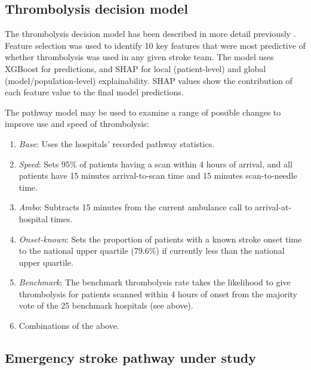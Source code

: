 \subsection{Thrombolysis decision model}

The thrombolysis decision model has been described in more detail previously \cite{pearn_what_2023}. Feature selection was used to identify 10 key features that were most predictive of whether thrombolysis was used in any given stroke team. The model uses XGBoost \cite{chen_xgboost_2016} for predictions, and SHAP \cite{lundberg_unified_2017} for local (patient-level) and global (model/population-level) explainability. SHAP values show the contribution of each feature value to the final model predictions.


The pathway model may be used to examine a range of possible changes to improve use and speed of thrombolysis:

\begin{enumerate}

    \item \textit{Base}: Uses the hospitals’ recorded pathway statistics.

    \item \textit{Speed}: Sets 95\% of patients having a scan within 4 hours of arrival, and all patients have 15 minutes arrival-to-scan time and 15 minutes scan-to-needle time.

    \item \textit{Ambo}: Subtracts 15 minutes from the current ambulance call to arrival-at-hospital times.

    \item  \textit{Onset-known}: Sets the proportion of patients with a known stroke onset time to the national upper quartile (79.6\%) if currently less than the national upper quartile.

    \item \textit{Benchmark}: The benchmark thrombolysis rate takes the likelihood to give thrombolysis for patients scanned within 4 hours of onset from the majority vote of the 25 benchmark hospitals (see above).

    \item Combinations of the above.
    
\end{enumerate}


\subsection{Emergency stroke pathway under study}

